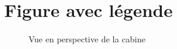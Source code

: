 \section{Figure avec légende}

	\begin{figure}[H]
	\centering
	\caption{Vue en perspective de la cabine}
	\end{figure}